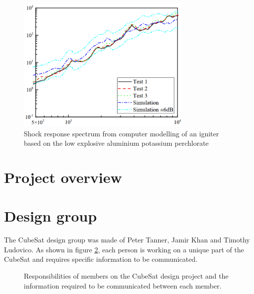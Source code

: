 \documentclass[a4paper,11pt]{article}
\begin{document}
\begin{figure}[H]
  \centering
  \includegraphics[width=0.75\textwidth]{images/deflagration.png}
  \caption{Shock response spectrum from computer modelling of an igniter based on the low explosive aluminium potassium perchlorate \cite{wang2023numerical}}
  \label{fig:lowsrs}
\end{figure}


\section{Project overview}



\section{Design group}

The CubeSat design group was made of Peter Tanner, Jamir Khan and Timothy Ludovico. As shown in figure \ref{fig:cubesat-responsibilities}, each person is working on a unique part of the CubeSat and requires specific information to be communicated.

\begin{figure}[H]
  \centering
  
  \caption{Responsibilities of members on the CubeSat design project and the information required to be communicated between each member.}
  \label{fig:cubesat-responsibilities}
\end{figure}
\end{document}
